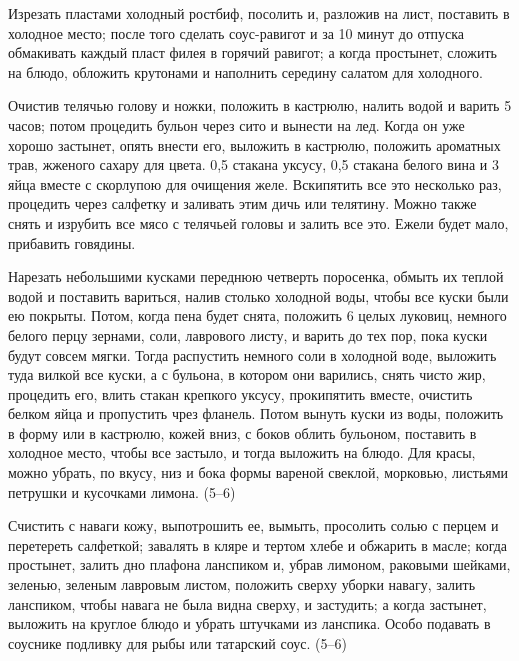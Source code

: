 Изрезать пластами холодный ростбиф, посолить и, разложив на лист, поставить в холодное место; после того сделать соус-равигот и за 10 минут до отпуска обмакивать каждый пласт филея в горячий равигот; а когда простынет, сложить на блюдо, обложить крутонами и наполнить середину салатом для холодного. 


Очистив телячью голову и ножки, положить в кастрюлю, налить водой и варить 5 часов; потом процедить бульон через сито и вынести на лед. Когда он уже хорошо застынет, опять внести его, выложить в кастрюлю, положить ароматных трав, жженого сахару для цвета. 0,5 стакана уксусу, 0,5 стакана белого вина и 3 яйца вместе с скорлупою для очищения желе. Вскипятить все это несколько раз, процедить через салфетку и заливать этим дичь или телятину. Можно также снять и изрубить все мясо с телячьей головы и залить все это. Ежели будет мало, прибавить говядины. 


Нарезать небольшими кусками переднюю четверть поросенка, обмыть их теплой водой и поставить вариться, налив столько холодной воды, чтобы все куски были ею покрыты. Потом, когда пена будет снята, положить 6 целых луковиц, немного белого перцу зернами, соли, лаврового листу, и варить до тех пор, пока куски будут совсем мягки. Тогда распустить немного соли в холодной воде, выложить туда вилкой все куски, а с бульона, в котором они варились, снять чисто жир, процедить его, влить стакан крепкого уксусу, прокипятить вместе, очистить белком яйца и пропустить чрез фланель. Потом вынуть куски из воды, положить в форму или в кастрюлю, кожей вниз, с боков облить бульоном, поставить в холодное место, чтобы все застыло, и тогда выложить на блюдо. Для красы, можно убрать, по вкусу, низ и бока формы вареной свеклой, морковью, листьями петрушки и кусочками лимона. (5--6) 


Счистить с наваги кожу, выпотрошить ее, вымыть, просолить солью с перцем и перетереть салфеткой; завалять в кляре и тертом хлебе и обжарить в масле; когда простынет, залить дно плафона ланспиком и, убрав лимоном, раковыми шейками, зеленью, зеленым лавровым листом, положить сверху уборки навагу, залить ланспиком, чтобы навага не была видна сверху, и застудить; а когда застынет, выложить на круглое блюдо и убрать штучками из ланспика. Особо подавать в соуснике подливку для рыбы или татарский соус. (5--6)

